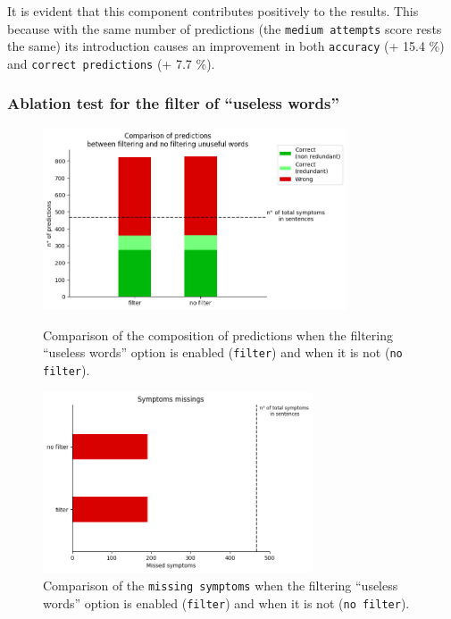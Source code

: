 
It is evident that this component contributes positively to the results. This because with the same number of predictions (the \texttt{medium attempts} score rests the same) its introduction causes an improvement in both \texttt{accuracy} (+ 15.4 \%) and \texttt{correct predictions} (+ 7.7 \%).


\newpage
\subsubsection{Ablation test for the filter of ``useless words''}
\begin{figure}[h]%
  \centering
  \begin{minipage}[b]{0.4\textwidth}
    \includegraphics[width=9cm]{graphs/comparison_filtering}
    \caption{Comparison of the composition of predictions when the filtering ``useless words'' option is enabled (\texttt{filter}) and when it is not (\texttt{no filter}).}
  \end{minipage}
  \hfill
  \begin{minipage}[b]{0.4\textwidth}
    \includegraphics[width=8cm]{graphs/comparison_filtering_missings}
    \caption{Comparison of the \texttt{missing symptoms} when the filtering ``useless words'' option is enabled (\texttt{filter}) and when it is not (\texttt{no filter}).}
  \end{minipage}
\end{figure}


